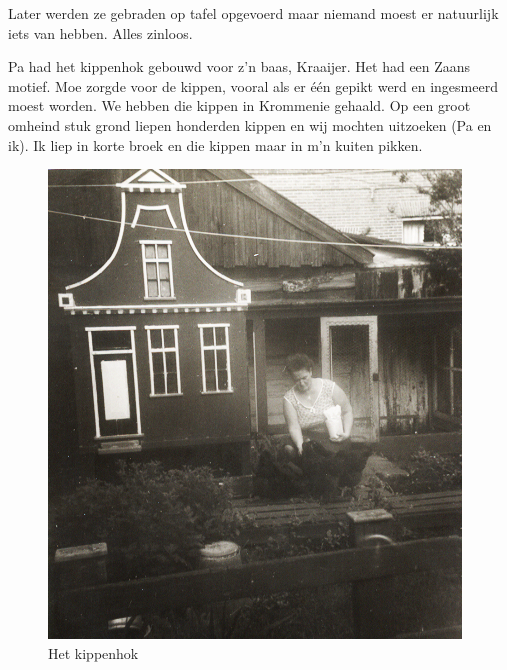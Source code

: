 \documentclass[12pt,twoside]{memoir}
\begin{document}
Later werden ze gebraden op tafel opgevoerd maar niemand moest er natuurlijk iets van hebben. Alles zinloos. 

Pa had het kippenhok gebouwd voor z’n baas, Kraaijer. Het had een Zaans motief. Moe zorgde voor de kippen, vooral als er één gepikt werd en ingesmeerd moest worden. We hebben die kippen in Krommenie gehaald. Op een groot omheind stuk grond liepen honderden kippen en wij mochten uitzoeken (Pa en ik). Ik liep in korte broek en die kippen maar in m’n kuiten pikken. 

\begin{figure}
\includegraphics[width=\textwidth]{img/ch5/kippenhok}
\caption*{\footnotesize Het kippenhok}
\end{figure}
\end{document}
